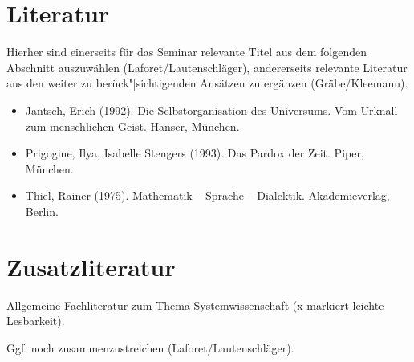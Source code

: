 \documentclass[11pt,a4paper]{article}
\begin{document}
\section{Literatur}

Hierher sind einerseits für das Seminar relevante Titel aus dem folgenden
Abschnitt auszuwählen (Laforet/Lautenschläger), andererseits relevante
Literatur aus den weiter zu berück"|sichtigenden Ansätzen zu ergänzen
(Gräbe/Kleemann).

\begin{itemize}
\item Jantsch, Erich (1992). Die Selbstorganisation des Universums. Vom
  Urknall zum menschlichen Geist.  Hanser, München.
\item Prigogine, Ilya, Isabelle Stengers (1993). Das Pardox der Zeit. Piper,
  München.  
\item Thiel, Rainer (1975). Mathematik -- Sprache -- Dialektik. Akademieverlag,
  Berlin.
\end{itemize}
\section{Zusatzliteratur}

Allgemeine Fachliteratur zum Thema Systemwissenschaft (x markiert leichte
Lesbarkeit).

Ggf. noch zusammenzustreichen (Laforet/Lautenschläger).
\end{document}
